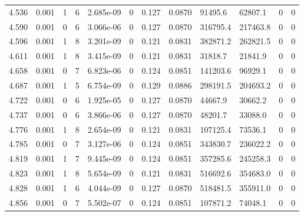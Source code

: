 \documentclass[preview]{standalone}
\begin{document}
{{{\begin{tabular}{L{1.2cm}C{1.2cm} C{0.3cm}C{0.5cm} C{1.4cm}C{1.4cm} C{1.4cm}C{1.4cm} C{1.6cm}C{1.6cm} C{1.6cm}C{1.6cm}}
  4.536  &  0.001  & 1     &  6 &  2.685e-09  & 0  &  0.127&   0.0870& 91495.6 & 62807.1   &  0 & 0  \\ 
  4.590  &  0.001  & 0     &  6 &  3.066e-06  & 0  &  0.127&   0.0870& 316795.4 & 217463.8   &  0 & 0  \\ 
  4.596  &  0.001  & 1     &  8 &  3.201e-09  & 0  &  0.121&   0.0831& 382871.2 & 262821.5   &  0 & 0  \\ 
  4.611  &  0.001  & 1     &  8 &  3.415e-09  & 0  &  0.121&   0.0831& 31818.7 & 21841.9   &  0 & 0  \\ 
  4.658  &  0.001  & 0     &  7 &  6.823e-06  & 0  &  0.124&   0.0851& 141203.6 & 96929.1   &  0 & 0  \\ 
  4.687  &  0.001  & 1     &  5 &  6.754e-09  & 0  &  0.129&   0.0886& 298191.5 & 204693.2   &  0 & 0  \\ 
  4.722  &  0.001  & 0     &  6 &  1.925e-05  & 0  &  0.127&   0.0870& 44667.9 & 30662.2   &  0 & 0  \\ 
  4.737  &  0.001  & 0     &  6 &  3.866e-06  & 0  &  0.127&   0.0870& 48201.7 & 33088.0   &  0 & 0  \\ 
  4.776  &  0.001  & 1     &  8 &  2.654e-09  & 0  &  0.121&   0.0831& 107125.4 & 73536.1   &  0 & 0  \\ 
  4.785  &  0.001  & 0     &  7 &  3.127e-06  & 0  &  0.124&   0.0851& 343830.7 & 236022.2   &  0 & 0  \\ 
  4.819  &  0.001  & 1     &  7 &  9.445e-09  & 0  &  0.124&   0.0851& 357285.6 & 245258.3   &  0 & 0  \\ 
  4.823  &  0.001  & 1     &  8 &  5.654e-09  & 0  &  0.121&   0.0831& 516692.6 & 354683.0   &  0 & 0  \\ 
  4.828  &  0.001  & 1     &  6 &  4.044e-09  & 0  &  0.127&   0.0870& 518481.5 & 355911.0   &  0 & 0  \\ 
  4.856  &  0.001  & 0     &  7 &  5.502e-07  & 0  &  0.124&   0.0851& 107871.2 & 74048.1   &  0 & 0  \\ 
\hline 
\end{tabular} 

}}}
\end{document}

